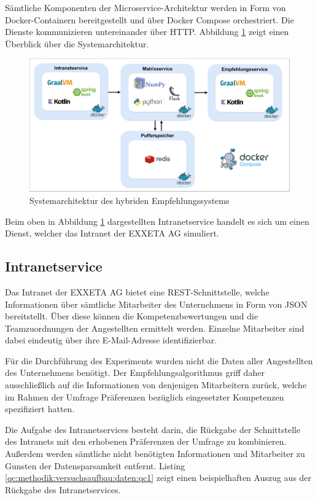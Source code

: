 Sämtliche Komponenten der Microservice-Architektur werden in Form von Docker-Containern bereitgestellt und über Docker Compose orchestriert. Die Dienste kommunizieren untereinander über HTTP. Abbildung \ref{fig:methodik:systemarchitekturn:abb1} zeigt einen Überblick über die Systemarchitektur.

\begin{figure}[h]
	\centering
	\includegraphics[width=1\textwidth]{gfx/ArchitekturMitLinie.jpg}
	\caption{Systemarchitektur des hybriden Empfehlungssystems}
	\label{fig:methodik:systemarchitekturn:abb1}
\end{figure}

Beim oben in Abbildung \ref{fig:methodik:systemarchitekturn:abb1} dargestellten Intranetservice handelt es sich um einen Dienst, welcher das Intranet der EXXETA AG simuliert.

\subsection{Intranetservice}
\label{ch:methodik:versuchsaufbau:systemarchitektur:intranetservice}
Das Intranet der EXXETA AG bietet eine REST-Schnittstelle, welche Informationen über sämtliche Mitarbeiter des Unternehmens in Form von JSON bereitstellt. Über diese können die Kompetenzbewertungen und die Teamzuordnungen der Angestellten ermittelt werden. Einzelne Mitarbeiter sind dabei eindeutig über ihre E-Mail-Adresse identifizierbar.

Für die Durchführung des Experiments wurden nicht die Daten aller Angestellten des Unternehmens benötigt. Der Empfehlungsalgorithmus griff daher ausschließlich auf die Informationen von denjenigen Mitarbeitern zurück, welche im Rahmen der Umfrage Präferenzen bezüglich eingesetzter Kompetenzen spezifiziert hatten.

Die Aufgabe des Intranetservices besteht darin, die Rückgabe der Schnittstelle des Intranets mit den erhobenen Präferenzen der Umfrage zu kombinieren. Außerdem werden sämtliche nicht benötigten Informationen und Mitarbeiter zu Gunsten der Datensparsamkeit entfernt. Listing \ref{qc:methodik:versuchsaufbau:daten:qc1} zeigt einen beispielhaften Auszug aus der Rückgabe des Intranetservices.

